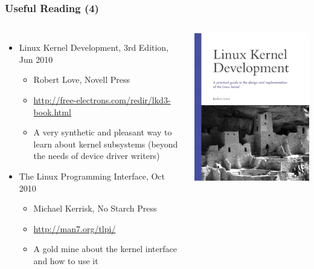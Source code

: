 \begin{frame}
  \frametitle{Useful Reading (4)}
  \begin{columns}
    \begin{itemize}
    \item Linux Kernel Development, 3rd Edition, Jun 2010
      \begin{itemize}
      \item Robert Love, Novell Press
      \item \url{http://free-electrons.com/redir/lkd3-book.html}
      \item A very synthetic and pleasant way to learn about kernel
        subsystems (beyond the needs of device driver writers)
      \end{itemize}
    \item The Linux Programming Interface, Oct 2010
      \begin{itemize}
      \item Michael Kerrisk, No Starch Press
      \item \url{http://man7.org/tlpi/}
      \item A gold mine about the kernel interface and how to use it
      \end{itemize}
    \end{itemize}
    \begin{center}
      \includegraphics[height=0.4\textheight]{slides/kernel-resources-references/linux-kernel-development.jpg}\\

\end{center}
\end{columns}
\end{frame}
